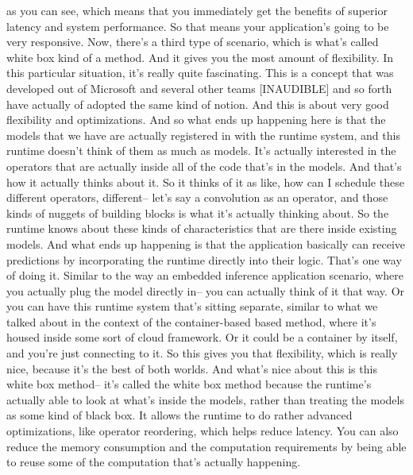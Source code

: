 {{{{{{{     as you can see, which means that you immediately
     get the benefits of superior latency and system performance.
     So that means your application's going to be very responsive.
     Now, there's a third type of scenario, which is what's
     called white box kind of a method.
     And it gives you the most amount of flexibility.
     In this particular situation, it's really quite fascinating.
     This is a concept that was developed out of Microsoft
     and several other teams [INAUDIBLE] and so forth have actually
     of adopted the same kind of notion.
     And this is about very good flexibility and optimizations.
     And so what ends up happening here is that the models that we have
     are actually registered in with the runtime system,
     and this runtime doesn't think of them as much as models.
     It's actually interested in the operators that are actually inside all
     of the code that's in the models.
     And that's how it actually thinks about it.
     So it thinks of it as like, how can I schedule these different operators,
     different-- let's say a convolution as an operator,
     and those kinds of nuggets of building blocks
     is what it's actually thinking about.
     So the runtime knows about these kinds of characteristics
     that are there inside existing models.
     And what ends up happening is that the application basically
     can receive predictions by incorporating the runtime directly into their logic.
     That's one way of doing it.
     Similar to the way an embedded inference application
     scenario, where you actually plug the model directly in-- you
     can actually think of it that way.
     Or you can have this runtime system that's
     sitting separate, similar to what we talked
     about in the context of the container-based based method, where
     it's housed inside some sort of cloud framework.
     Or it could be a container by itself, and you're just connecting to it.
     So this gives you that flexibility, which is really nice,
     because it's the best of both worlds.
     And what's nice about this is this white box method--
     it's called the white box method because the runtime's actually
     able to look at what's inside the models,
     rather than treating the models as some kind of black box.
     It allows the runtime to do rather advanced optimizations,
     like operator reordering, which helps reduce latency.
     You can also reduce the memory consumption and the computation
     requirements by being able to reuse some of the computation that's actually
     happening.
}}}}}}}
